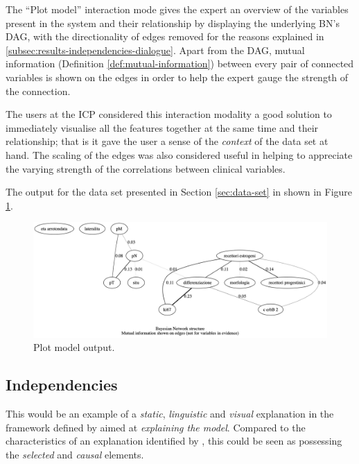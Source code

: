 The \enquote{Plot model} interaction mode gives the expert an overview of the variables present in the system and their relationship by displaying the underlying BN's DAG, with the directionality of edges removed for the reasons explained in \ref{subsec:results-independencies-dialogue}.
Apart from the DAG, mutual information (Definition \ref{def:mutual-information}) between every pair of connected variables is shown on the edges in order to help the expert gauge the strength of the connection.

The users at the ICP considered this interaction modality a good solution to immediately visualise all the features together at the same time and their relationship; that is it gave the user a sense of the \textit{context} of the data set at hand. 
The scaling of the edges was also considered useful in helping to appreciate the varying strength of the correlations between clinical variables.

The output for the data set presented in Section \ref{sec:data-set} in shown in Figure \ref{fig:sw_plot_result}.

\begin{figure}[htbp]
\centerline{\includegraphics[width=\textwidth]{results/images/plot_result}}
\caption{Plot model output.}
\label{fig:sw_plot_result}
\end{figure}

\subsection{Independencies} \label{subsec:results-independencies-query}
This would be an example of a \textit{static}, \textit{linguistic} and \textit{visual} explanation in the framework defined by \citet{lacave2002review} aimed at \textit{explaining the model}.
Compared to the characteristics of an explanation identified by \citet{miller2018explanation}, this could be seen as possessing the \textit{selected} and \textit{causal} elements.

